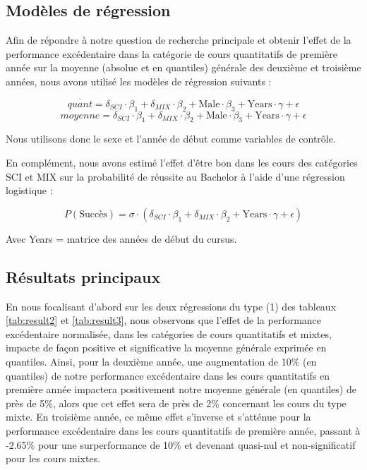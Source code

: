 \subsection{Modèles de régression}
Afin de répondre à notre question de recherche principale et obtenir l’effet de la performance excédentaire dans la catégorie de cours quantitatifs de première année sur la moyenne (absolue et en quantiles) générale des deuxième et troisième années, nous avons utilisé les modèles de régression suivants :


\begin{equation}
\overline{quant} = \delta_{SCI} \cdot \beta_1 + \delta_{MIX} \cdot \beta_2 + \text{Male} \cdot \beta_3 + \text{Years} \cdot \gamma + \epsilon
\label{eq:model1}
\end{equation}
\begin{equation}
moyenne = \delta_{SCI} \cdot \beta_1 + \delta_{MIX} \cdot \beta_2 + \text{Male} \cdot \beta_3 + \text{Years} \cdot \gamma + \epsilon
\label{eq:model2}
\end{equation}

Nous utilisons donc le sexe et l'année de début comme variables de contrôle.

En complément, nous avons estimé l’effet d’être bon dans les cours des catégories SCI et MIX sur la probabilité de réussite au Bachelor à l’aide d’une régression logistique :

\begin{equation}
P(\text{Succès}) = \sigma \cdot (\delta_{SCI} \cdot \beta_1 +  \delta_{MIX} \cdot \beta_2 + \text{Years} \cdot \gamma + \epsilon)
\label{eq:logit}
\end{equation}


Avec Years = matrice des années de début du cursus.

\subsection{Résultats principaux}

En nous focalisant d’abord sur les deux régressions du type (1) des tableaux \ref{tab:result2} et \ref{tab:result3}, nous observons que l’effet de la performance excédentaire normalisée, dans les catégories de cours quantitatifs et mixtes, impacte de façon positive et significative la moyenne générale exprimée en quantiles. Ainsi, pour la deuxième année, une augmentation de 10\% (en quantiles) de notre performance excédentaire dans les cours quantitatifs en première année impactera positivement notre moyenne générale (en quantiles) de près de 5\%, alors que cet effet sera de près de 2\% concernant les cours du type mixte. En troisième année, ce même effet s’inverse et s’atténue pour la performance excédentaire dans les cours quantitatifs de première année, passant à -2.65\% pour une surperformance de 10\% et devenant quasi-nul et non-significatif pour les cours mixtes.

